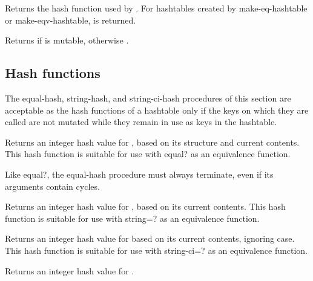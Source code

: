\begin{entry}{}

Returns the hash function used by .
For hashtables created by {\cf make-eq-hashtable} 
or {\cf make-eqv-hashtable}, \schfalse{} is returned.
\end{entry}

\begin{entry}{}

Returns \schtrue{} if  is mutable, otherwise \schfalse{}.
\end{entry}

\subsection{Hash functions}

The {\cf equal-hash}, {\cf string-hash}, and {\cf string-ci-hash}
procedures of this section are acceptable as the hash functions of
a hashtable only if the keys on which they are called are not mutated
while they remain in use as keys in the hashtable.

\begin{entry}{}

Returns an integer hash value for , based on
its structure and current contents.  This hash function is suitable
for use with {\cf equal?} as an equivalence function.

\begin{note}
  Like {\cf equal?}, the {\cf equal-hash} procedure must always
  terminate, even if its arguments contain cycles.
\end{note}
\end{entry}

\begin{entry}{}

Returns an integer hash value for , based on
its current contents.
This hash function is suitable
for use with {\cf string=?} as an equivalence function.
\end{entry}

\begin{entry}{}

Returns an integer hash value for  based on
its current contents, ignoring case.
This hash function is suitable
for use with {\cf string-ci=?} as an equivalence function.
\end{entry}

\begin{entry}{}

Returns an integer hash value for .
\end{entry}
